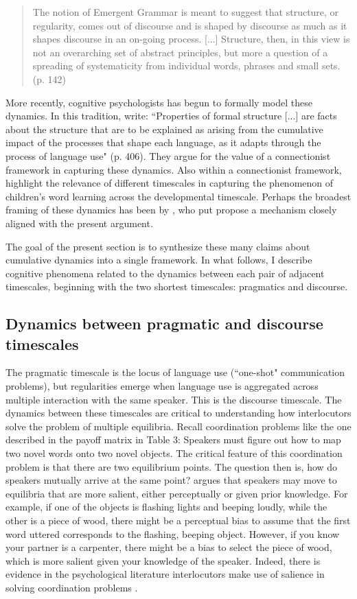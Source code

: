 \documentclass[man, noapacite, 12pt]{apa2}
\begin{document}
\begin{quote} The notion of Emergent Grammar is meant to suggest that structure, or regularity, comes out of discourse and is shaped by discourse as much as it shapes discourse in an on-going process. [...] Structure, then, in this view is not an overarching set of abstract principles, but more a question of a spreading of systematicity from individual words, phrases and small sets. (p. 142)
\end{quote}
More recently, cognitive psychologists has begun to formally model these dynamics. In this tradition,  write: ``Properties of formal structure [...] are facts about the structure that are to be explained as arising from the cumulative impact of the processes that shape each language, as it adapts through the process of language use" (p. 406). They argue for the value of a connectionist framework in capturing these dynamics. Also within a  connectionist framework,  highlight the relevance of different timescales in capturing the phenomenon of children's word learning across the developmental timescale. Perhaps the broadest framing of these dynamics has been by , who put propose a mechanism closely aligned with the present argument.

The goal of the present section is to synthesize these many claims about cumulative dynamics into a single framework. In what follows, I describe cognitive phenomena related to the dynamics between each pair of adjacent timescales, beginning with the two shortest timescales: pragmatics and discourse. 

\subsection{Dynamics between pragmatic and discourse timescales} 
The pragmatic timescale is the locus of language use (``one-shot" communication problems), but regularities emerge when language use is aggregated across multiple interaction with the same speaker. This is the discourse timescale. The dynamics between these  timescales are critical to understanding how interlocutors solve the problem of multiple equilibria. Recall coordination problems like the one described in the payoff matrix in Table 3: Speakers must figure out how to map two novel words onto two novel objects. The critical feature of this coordination problem is that there are two equilibrium points. The question then is, how do speakers mutually arrive at the same point?  argues that speakers may move to equilibria that are more salient, either perceptually or given prior knowledge. For example, if one of the objects is flashing lights and beeping  loudly, while the other is a  piece of wood, there might be a perceptual bias to assume that the first word uttered corresponds to the flashing, beeping object.  However, if you know your partner is a carpenter, there might be a bias to select the piece of wood, which is more salient given your knowledge of the speaker. Indeed, there is evidence in the psychological literature interlocutors make use of salience in solving coordination problems \cite{clark1983common}. 
\end{document}
